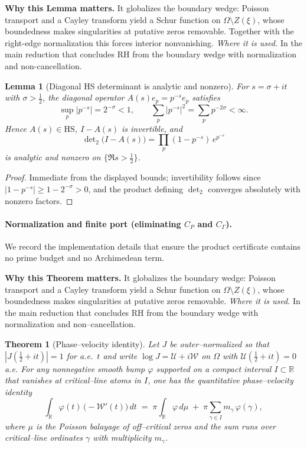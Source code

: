 \documentclass[11pt]{article}
\newtheorem{theorem}{Theorem}[section]
\newtheorem{lemma}{Lemma}[section]
\theoremstyle{definition}
\theoremstyle{remark}
\providecommand{\Hp}{\Omega} %
\begin{document}
\vspace{1.0cm}
\noindent\textbf{Why this Lemma matters.} It globalizes the boundary wedge: Poisson transport and a Cayley transform yield a Schur function on $\Omega\setminus Z(\xi)$, whose boundedness makes singularities at putative zeros removable. Together with the right-edge normalization this forces interior nonvanishing.
\noindent\textit{Where it is used.} In the main reduction that concludes RH from the boundary wedge with normalization and non-cancellation.
\begin{lemma}[Diagonal HS determinant is analytic and nonzero]
\label{lem:hs-diagonal}
For $s=\sigma+it$ with $\sigma>\tfrac12$, the diagonal operator $A(s)e_p=p^{-s}e_p$ satisfies
\[
\sup_{p}|p^{-s}|=2^{-\sigma}<1,\qquad \sum_{p}|p^{-s}|^2=\sum_{p}p^{-2\sigma}<\infty.
\]
Hence $A(s)\in\mathrm{HS}$, $I-A(s)$ is invertible, and
\[
\det\nolimits_2\big(I-A(s)\big)=\prod_{p}(1-p^{-s})\,e^{p^{-s}}
\]
is analytic and nonzero on $\{\Re s>\tfrac12\}$.
\end{lemma}
\begin{proof}
  Immediate from the displayed bounds; invertibility follows since $|1-p^{-s}|\ge 1-2^{-\sigma}>0$,
  and the product defining $\det_2$ converges absolutely with nonzero factors.
\end{proof}







\vspace{1.0cm}
\paragraph{Normalization and finite port (eliminating $C_P$ and $C_\Gamma$).}
We record the implementation details that ensure the product certificate contains no prime budget and no Archimedean term.


\noindent\textbf{Why this Theorem matters.} It globalizes the boundary wedge: Poisson transport and a Cayley transform yield a Schur function on $\Omega\setminus Z(\xi)$, whose boundedness makes singularities at putative zeros removable.
\noindent\textit{Where it is used.} In the main reduction that concludes RH from the boundary wedge with normalization and non--cancellation.
\begin{theorem}[Phase--velocity identity]\label{thm:phase-velocity-quant}
Let $J$ be outer--normalized so that $|J(\tfrac12+it)|=1$ for a.e.\ $t$ and write $\log J=\mathcal U+i\mathcal W$ on $\Hp$ with $\mathcal U(\tfrac12+it)=0$ a.e.
For any nonnegative smooth bump $\varphi$ supported on a compact interval $I\subset\mathbb R$ that vanishes at critical--line atoms in $I$, one has the quantitative phase--velocity identity
\begin{equation*}
\int_{\mathbb R}\varphi(t)\,\bigl(-\mathcal W'(t)\bigr)\,dt\;=\;\pi\int_{\mathbb R}\varphi\,d\mu\;+\;\pi\sum_{\gamma\in I} m_\gamma\,\varphi(\gamma),
\end{equation*}
where $\mu$ is the Poisson balayage of off--critical zeros and the sum runs over critical--line ordinates $\gamma$ with multiplicity $m_\gamma$.
\end{theorem}
\end{document}
